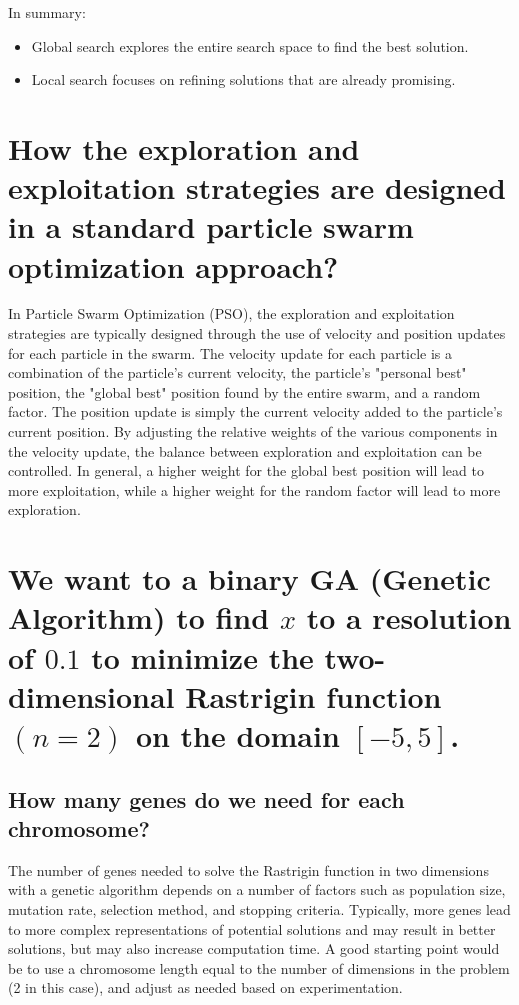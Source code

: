 \documentclass[conference]{IEEEtran}
\begin{document}
In summary:
\begin{itemize}
	\item Global search explores the entire search space to find the best solution.
	\item Local search focuses on refining solutions that are already promising.
\end{itemize}


\section{How the exploration and exploitation strategies are designed in a standard particle swarm optimization approach?}

In Particle Swarm Optimization (PSO), the exploration and exploitation strategies are typically designed through the use of velocity and position updates for each particle in the swarm. The velocity update for each particle is a combination of the particle's current velocity, the particle's "personal best" position, the "global best" position found by the entire swarm, and a random factor. The position update is simply the current velocity added to the particle's current position. By adjusting the relative weights of the various components in the velocity update, the balance between exploration and exploitation can be controlled. In general, a higher weight for the global best position will lead to more exploitation, while a higher weight for the random factor will lead to more exploration.

\section{We want to a binary GA (Genetic Algorithm) to find $x$ to a resolution of $0.1$ to minimize the two-dimensional Rastrigin function $(n=2)$ on the domain $[-5,5]$.}

\subsection{How many genes do we need for each chromosome?}

The number of genes needed to solve the Rastrigin function in two dimensions with a genetic algorithm depends on a number of factors such as population size, mutation rate, selection method, and stopping criteria. Typically, more genes lead to more complex representations of potential solutions and may result in better solutions, but may also increase computation time. A good starting point would be to use a chromosome length equal to the number of dimensions in the problem (2 in this case), and adjust as needed based on experimentation.
\end{document}
